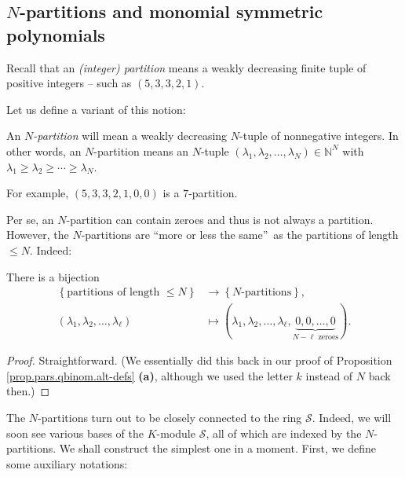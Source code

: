 \subsection{\label{sec.sf.m}$N$-partitions and monomial symmetric polynomials}

Recall that an \emph{(integer) partition} means a weakly decreasing finite
tuple of positive integers -- such as $\left(  5,3,3,2,1\right)  $.

Let us define a variant of this notion:

\begin{definition}
\label{def.sf.Npar}An $N$\emph{-partition} will mean a weakly decreasing
$N$-tuple of nonnegative integers. In other words, an $N$-partition means an
$N$-tuple $\left(  \lambda_{1},\lambda_{2},\ldots,\lambda_{N}\right)
\in\mathbb{N}^{N}$ with $\lambda_{1}\geq\lambda_{2}\geq\cdots\geq\lambda_{N}$.
\end{definition}

For example, $\left(  5,3,3,2,1,0,0\right)  $ is a $7$-partition.

Per se, an $N$-partition can contain zeroes and thus is not always a
partition. However, the $N$-partitions are \textquotedblleft more or less the
same\textquotedblright\ as the partitions of length $\leq N$. Indeed:

\begin{proposition}
\label{prop.sf.Npar-as-par}There is a bijection%
\begin{align*}
\left\{  \text{partitions of length }\leq N\right\}   &  \rightarrow\left\{
N\text{-partitions}\right\}  ,\\
\left(  \lambda_{1},\lambda_{2},\ldots,\lambda_{\ell}\right)   &
\mapsto\left(  \lambda_{1},\lambda_{2},\ldots,\lambda_{\ell}%
,\underbrace{0,0,\ldots,0}_{N-\ell\text{ zeroes}}\right)  .
\end{align*}

\end{proposition}

\begin{proof}
Straightforward. (We essentially did this back in our proof of Proposition
\ref{prop.pars.qbinom.alt-defs} \textbf{(a)}, although we used the letter $k$
instead of $N$ back then.)
\end{proof}

The $N$-partitions turn out to be closely connected to the ring $\mathcal{S}$.
Indeed, we will soon see various bases of the $K$-module $\mathcal{S}$, all of
which are indexed by the $N$-partitions. We shall construct the simplest one
in a moment. First, we define some auxiliary notations:

